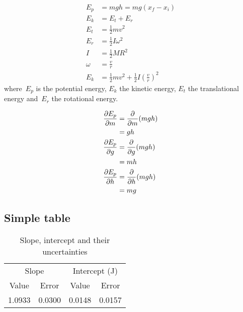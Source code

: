 \documentclass[../main.tex]{subfiles}
\begin{document}
\begin{align}
        E_p &= mgh = mg(x_f - x_i) \label{potential}
        \\
        E_k &= E_t + E_r \nonumber
        \\
        E_t &= \frac{1}{2} mv^2 \label{translational}
        \\
        E_r &= \frac{1}{2} I \omega^2 \label{rotational}
        \\
        I &= \frac{1}{2} M R^2 \label{inertia}
        \\
        \omega &= \frac{v}{r} \nonumber
        \\
        E_k &= \frac{1}{2} mv^2 +  \frac{1}{2} I \left( \frac{v}{r}\right) ^2 \label{kinetic}
\end{align}
where~$E_p$ is the potential energy, $E_k$ the kinetic
energy, $E_t$ the translational energy and~$E_r$
the rotational energy.

\begin{align*}
        \pdv{E_p}{m} &= \pdv{m}(mgh)
        \\
                          &= gh
                          \\
        \pdv{E_p}{g} &= \pdv{g}(mgh)
        \\
                          &= mh
        \\
        \pdv{E_p}{h} &= \pdv{h}(mgh)
        \\
                          &= mg
\end{align*}

\subsection{Simple table}

\begin{table}[H]
    \centering
    \caption{Slope, intercept and their uncertainties}
    \label{tab:slope}
    \begin{tabular}{*{4}c}
        \toprule
        \multicolumn{2}{c}{Slope} &
        \multicolumn{2}{c}{Intercept (\si{\joule})} \\
        Value & Error & Value & Error \\
        \cmidrule(r){1-2} \cmidrule(l){3-4}
        1.0933 & 0.0300 & 0.0148 & 0.0157 \\

        \bottomrule
    \end{tabular}
\end{table}
\end{document}
